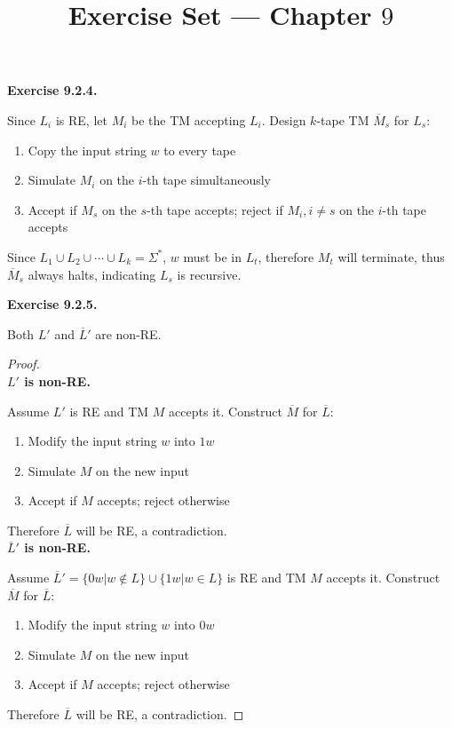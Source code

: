 \documentclass[a4paper]{article}
\title{Exercise Set --- Chapter $9$}
\date{}
\newtheorem*{proof}{Proof}
\newenvironment{exercise}[1]{
	\par
	\noindent\textbf{Exercise #1.}\quad
}{
	\par
	\bigskip
}
\begin{document}
\maketitle

\begin{exercise}{9.2.4} 
        Since $L_i$ is RE, let $M_i$ be the TM accepting $L_i$.
        Design $k$-tape TM $\overline{M}_s$ for $L_s$:
        \begin{enumerate}
            \item Copy the input string $w$ to every tape
            \item Simulate $M_i$ on the $i$-th tape simultaneously
            \item Accept if $M_s$ on the $s$-th tape accepts;
                reject if $M_i,i\neq s$ on the $i$-th tape accepts
        \end{enumerate}
        Since $L_1\cup L_2\cup\cdots\cup L_k=\Sigma^*$, $w$ must be in $L_t$, therefore
        $M_t$ will terminate, thus $\overline{M}_s$ always halts, indicating $L_s$ is recursive.
\end{exercise}

\begin{exercise}{9.2.5} 
    Both $L'$ and $\overline{L}'$ are non-RE.
    \begin{proof}\hspace{0pt}\\
        \noindent \textbf{$L'$ is non-RE.}\par
        Assume $L'$ is RE and TM $M$ accepts it. Construct $\overline{M}$ for $\overline{L}$:
        \begin{enumerate}
            \item Modify the input string $w$ into $1w$
            \item Simulate $M$ on the new input
            \item Accept if $M$ accepts; reject otherwise
        \end{enumerate}
        Therefore $\overline{L}$ will be RE, a contradiction.\\
        \noindent \textbf{$\overline{L}'$ is non-RE.}\par
        Assume $\overline{L}'=\{0w|w\notin L\}\cup\{1w|w\in L\}$ is RE and TM $M$ accepts it.
        Construct $\overline{M}$ for $\overline{L}$:
        \begin{enumerate}
            \item Modify the input string $w$ into $0w$
            \item Simulate $M$ on the new input
            \item Accept if $M$ accepts; reject otherwise
        \end{enumerate}
        Therefore $\overline{L}$ will be RE, a contradiction.
    \end{proof}
\end{exercise}
\end{document}
